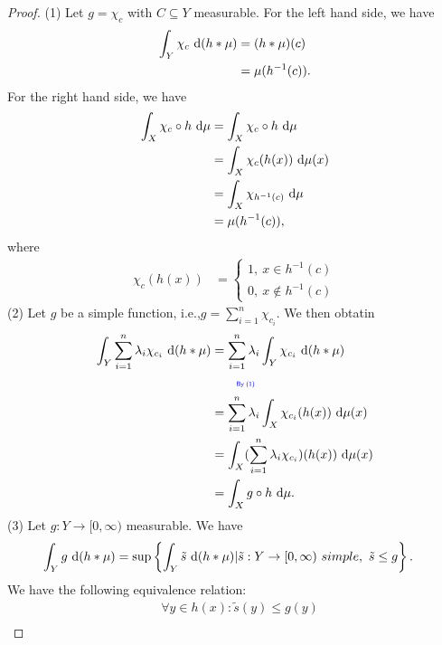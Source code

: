 \documentclass[../../note.tex]{subfiles}
\begin{document}
\begin{proof}
    \label{pf of substitution rule}
    (1) Let $g = \chi_c$ with $C \subseteq Y$ measurable. For the left hand side, we have
    \begin{align}
        \int_Y \chi_c~{\rm d}(h * \mu) 
        &= (h * \mu)(c) \\
        &= \mu(h^{-1}(c)).
    \end{align}
    For the right hand side, we have
    \begin{align}
        \int_X \chi_c \circ h~{\rm d}\mu
        &= \int_X \chi_c \circ h~{\rm d}\mu \\
        &= \int_X \chi_c(h(x))~{\rm d}\mu(x) \\
        &= \int_X \chi_{h^{-1}(c)}~{\rm d}\mu \\
        &= \mu(h^{-1}(c)),
    \end{align}
    where
    \begin{align}
        \chi_c(h(x))
        &=\left\{
            \begin{matrix}
                1,~x \in h^{-1}(c) \\
                0,~x \notin h^{-1}(c)
            \end{matrix}
        \right.
    \end{align}
    (2) Let $g$ be a simple function, i.e.,$g = \sum_{i=1}^n \chi_{c_i}$. We then obtatin
    \begin{align}
        \int_Y \sum_{i=1}^n \lambda_i \chi_{c_i}~{\rm d}(h*\mu)
        &= \sum_{i=1}^{n} \lambda_i \int_Y \chi_{c_i}~{\rm d}(h * \mu) \\
        &\qquad\text{\color{blue}{\tiny\sffamily By (1)}} \nonumber \\
        &= \sum_{i=1}^{n} \lambda_i \int_X \chi_{c_i}(h(x))~{\rm d}\mu(x) \\
        &= \int_X(\sum_{i=1}^n \lambda_i \chi_{c_i})(h(x))~{\rm d}\mu(x) \\
        &= \int_X g \circ h~{\rm d}\mu.
    \end{align}
    (3) Let $g: Y \rightarrow [0,\infty)$ measurable. We have
    \begin{align}
        \int_Y g~{\rm d}(h * \mu) 
        &= \sup\left\{\int_Y \tilde{s}~{\rm d}(h * \mu) \vert \tilde{s}: Y \rightarrow [0,\infty)~simple,~\tilde{s}\leq g\right\}.
    \end{align}
    We have the following equivalence relation:
    \begin{align}
        &\forall y \in h(x): \tilde{s}(y) \leq g(y) \\

\end{align}
\end{proof}
\end{document}
